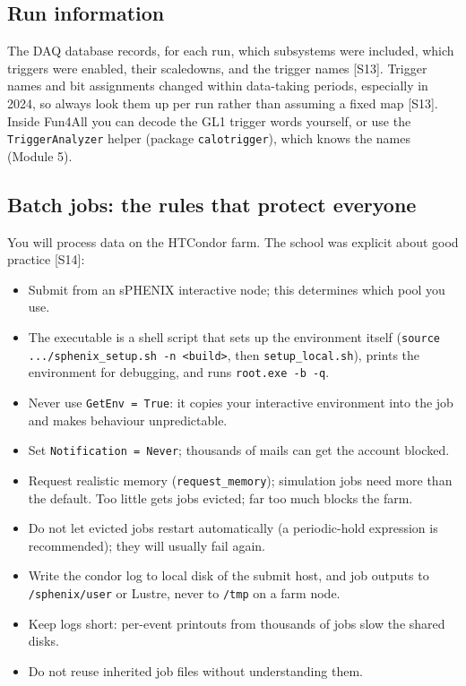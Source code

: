 \documentclass[11pt,letterpaper]{article}
\begin{document}
\subsection{Run information}
The DAQ database records, for each run, which subsystems were included, which triggers were enabled, their scaledowns, and the trigger names [S13].
Trigger names and bit assignments changed within data-taking periods, especially in 2024, so always look them up per run rather than assuming a fixed map [S13].
Inside Fun4All you can decode the GL1 trigger words yourself, or use the \texttt{TriggerAnalyzer} helper (package \texttt{calotrigger}), which knows the names (Module 5).

\subsection{Batch jobs: the rules that protect everyone}
You will process data on the HTCondor farm. The school was explicit about good practice [S14]:
\begin{itemize}
\item Submit from an sPHENIX interactive node; this determines which pool you use.
\item The executable is a shell script that sets up the environment itself (\texttt{source .../sphenix\_setup.sh -n <build>}, then \texttt{setup\_local.sh}), prints the environment for debugging, and runs \texttt{root.exe -b -q}.
\item Never use \texttt{GetEnv = True}: it copies your interactive environment into the job and makes behaviour unpredictable.
\item Set \texttt{Notification = Never}; thousands of mails can get the account blocked.
\item Request realistic memory (\texttt{request\_memory}); simulation jobs need more than the default. Too little gets jobs evicted; far too much blocks the farm.
\item Do not let evicted jobs restart automatically (a periodic-hold expression is recommended); they will usually fail again.
\item Write the condor log to local disk of the submit host, and job outputs to \texttt{/sphenix/user} or Lustre, never to \texttt{/tmp} on a farm node.
\item Keep logs short: per-event printouts from thousands of jobs slow the shared disks.
\item Do not reuse inherited job files without understanding them.
\end{itemize}
\end{document}
